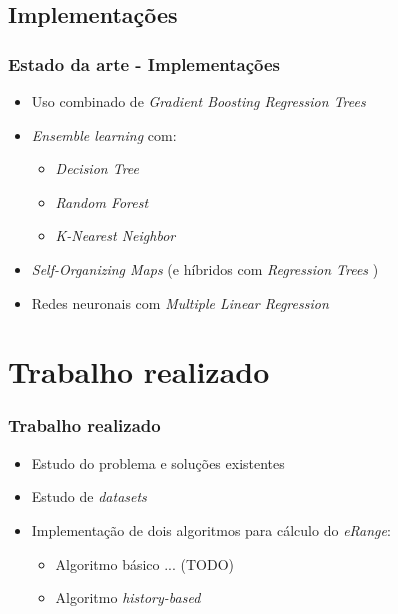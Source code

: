 \documentclass{beamer}
\begin{document}
\subsection[Implementacoes]{Implementações}
\begin{frame}[label={Implementacoes}]
\frametitle{Estado da arte - Implementações}

\let\oldfootnotesize\footnotesize
\renewcommand*{\footnotesize}{\oldfootnotesize\tiny}

\begin{itemize}
	\item Uso combinado de \textit{Gradient Boosting Regression Trees}
	\item \textit{Ensemble learning}  com: 
		  \begin{itemize}
			  \item \textit{Decision Tree }
			  \item \textit{Random Forest}
			  \item \textit{K-Nearest Neighbor}
		  \end{itemize}
	\item \textit{Self-Organizing Maps} 
		  (e híbridos com \textit{Regression Trees} )
	\item Redes neuronais com \textit{Multiple Linear Regression} 
\end{itemize}

\renewcommand*{\footnotesize}{\oldfootnotesize}

\end{frame}

\section[Trabalho realizado]{Trabalho realizado}
\begin{frame}
\frametitle{Trabalho realizado}

\begin{itemize}
	\item Estudo do problema e soluções existentes
	\item Estudo de \textit{datasets}
	\item Implementação de dois algoritmos para cálculo do \textit{eRange}:
		  \begin{itemize}
			  \item Algoritmo básico ... (TODO) 
			  \item Algoritmo \textit{history-based} 
		  \end{itemize}
\end{itemize}

\end{frame}
\end{document}
